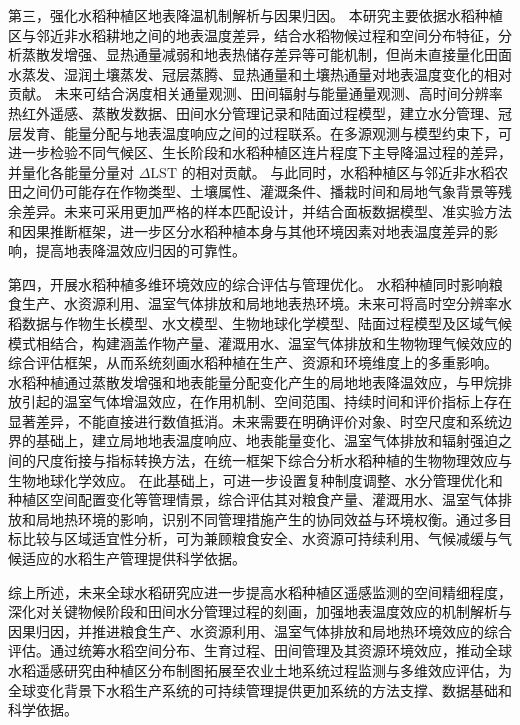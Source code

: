 第三，强化水稻种植区地表降温机制解析与因果归因。
本研究主要依据水稻种植区与邻近非水稻耕地之间的地表温度差异，结合水稻物候过程和空间分布特征，分析蒸散发增强、显热通量减弱和地表热储存差异等可能机制，但尚未直接量化田面水蒸发、湿润土壤蒸发、冠层蒸腾、显热通量和土壤热通量对地表温度变化的相对贡献。
未来可结合涡度相关通量观测、田间辐射与能量通量观测、高时间分辨率热红外遥感、蒸散发数据、田间水分管理记录和陆面过程模型，建立水分管理、冠层发育、能量分配与地表温度响应之间的过程联系。在多源观测与模型约束下，可进一步检验不同气候区、生长阶段和水稻种植区连片程度下主导降温过程的差异，并量化各能量分量对 $\Delta \mathrm{LST}$ 的相对贡献。
与此同时，水稻种植区与邻近非水稻农田之间仍可能存在作物类型、土壤属性、灌溉条件、播栽时间和局地气象背景等残余差异。未来可采用更加严格的样本匹配设计，并结合面板数据模型、准实验方法和因果推断框架，进一步区分水稻种植本身与其他环境因素对地表温度差异的影响，提高地表降温效应归因的可靠性。

第四，开展水稻种植多维环境效应的综合评估与管理优化。
水稻种植同时影响粮食生产、水资源利用、温室气体排放和局地地表热环境。未来可将高时空分辨率水稻数据与作物生长模型、水文模型、生物地球化学模型、陆面过程模型及区域气候模式相结合，构建涵盖作物产量、灌溉用水、温室气体排放和生物物理气候效应的综合评估框架，从而系统刻画水稻种植在生产、资源和环境维度上的多重影响。
水稻种植通过蒸散发增强和地表能量分配变化产生的局地地表降温效应，与甲烷排放引起的温室气体增温效应，在作用机制、空间范围、持续时间和评价指标上存在显著差异，不能直接进行数值抵消。未来需要在明确评价对象、时空尺度和系统边界的基础上，建立局地地表温度响应、地表能量变化、温室气体排放和辐射强迫之间的尺度衔接与指标转换方法，在统一框架下综合分析水稻种植的生物物理效应与生物地球化学效应。
在此基础上，可进一步设置复种制度调整、水分管理优化和种植区空间配置变化等管理情景，综合评估其对粮食产量、灌溉用水、温室气体排放和局地热环境的影响，识别不同管理措施产生的协同效益与环境权衡。通过多目标比较与区域适宜性分析，可为兼顾粮食安全、水资源可持续利用、气候减缓与气候适应的水稻生产管理提供科学依据。

综上所述，未来全球水稻研究应进一步提高水稻种植区遥感监测的空间精细程度，深化对关键物候阶段和田间水分管理过程的刻画，加强地表温度效应的机制解析与因果归因，并推进粮食生产、水资源利用、温室气体排放和局地热环境效应的综合评估。通过统筹水稻空间分布、生育过程、田间管理及其资源环境效应，推动全球水稻遥感研究由种植区分布制图拓展至农业土地系统过程监测与多维效应评估，为全球变化背景下水稻生产系统的可持续管理提供更加系统的方法支撑、数据基础和科学依据。